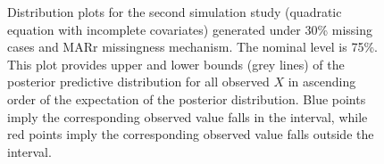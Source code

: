 \documentclass[12pt, fullpage, a4paper]{article}
\begin{document}
\begin{figure}
\begin{center}
{{			}
		}
	\end{center}
	\caption{Distribution plots for the second simulation study (quadratic equation with incomplete covariates) generated under 30\% missing cases and MARr missingness mechanism. The nominal level is 75\%. This plot provides upper and lower bounds (grey lines) of the posterior predictive distribution for all observed $X$ in ascending order of the expectation of the posterior distribution. Blue points imply the corresponding observed value falls in the interval, while red points imply the corresponding observed value falls outside the interval.}
	\label{fig6_6}
	
\end{figure}
\end{document}
